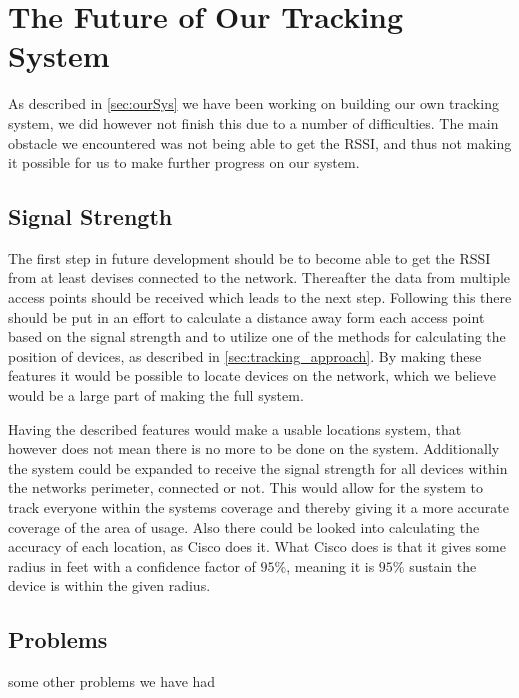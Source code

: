 \section{The Future of Our Tracking System}\label{sec:futureSystem}
As described in \cref{sec:ourSys} we have been working on building our own tracking system, we did however not finish this due to a number of difficulties. The main obstacle we encountered was not being able to get the RSSI, and thus not making it possible for us to make further progress on our system.

\subsection*{Signal Strength}
The first step in future development should be to become able to get the RSSI from at least devises connected to the network. Thereafter the data from multiple access points should be received which leads to the next step. Following this there should be put in an effort to calculate a distance away form each access point based on the signal strength and to utilize one of the methods for calculating the position of devices, as described in \cref{sec:tracking_approach}. By making these features it would be possible to locate devices on the network, which we believe would be a large part of making the full system.

Having the described features would make a usable locations system, that however does not mean there is no more to be done on the system. Additionally the system could be expanded to receive the signal strength for all devices within the networks perimeter, connected or not. This would allow for the system to track everyone within the systems coverage and thereby giving it a more accurate coverage of the area of usage.
Also there could be looked into calculating the accuracy of each location, as Cisco does it. What Cisco does is that it gives some radius in feet with a confidence factor of $95\%$, meaning it is $95\%$ sustain the device is within the given radius\cite{cisco_acc}. 

\subsection*{Problems}
some other problems we have had